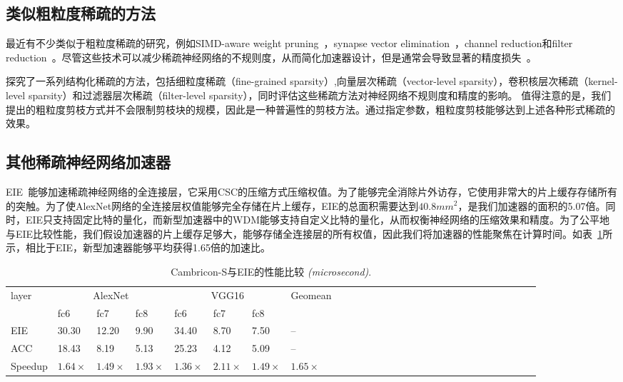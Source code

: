 \subsection{类似粗粒度稀疏的方法}
最近有不少类似于粗粒度稀疏的研究，例如SIMD-aware weight pruning~\cite{yu2017scalpel}，synapse vector elimination~\cite{hill2017deftnn}，channel reduction和filter reduction~\cite{wen2016learning,lebedev2016fast}。尽管这些技术可以减少稀疏神经网络的不规则度，从而简化加速器设计，但是通常会导致显著的精度损失~\cite{li2016pruning}。

\citet{mao2017exploring}探究了一系列结构化稀疏的方法，包括细粒度稀疏（fine-grained sparsity）,向量层次稀疏（vector-level sparsity），卷积核层次稀疏（kernel-level sparsity）和过滤器层次稀疏（filter-level sparsity），同时评估这些稀疏方法对神经网络不规则度和精度的影响。 值得注意的是，我们提出的粗粒度剪枝方式并不会限制剪枝块的规模，因此是一种普遍性的剪枝方法。通过指定参数，粗粒度剪枝能够达到上述各种形式稀疏的效果。

\subsection{其他稀疏神经网络加速器}
EIE~\cite{han2016eie}能够加速稀疏神经网络的全连接层，它采用CSC的压缩方式压缩权值。为了能够完全消除片外访存，它使用非常大的片上缓存存储所有的突触。为了使AlexNet网络的全连接层权值能够完全存储在片上缓存，EIE的总面积需要达到$40.8mm^2$，是我们加速器的面积的5.07倍。同时，EIE只支持固定比特的量化，而新型加速器中的WDM能够支持自定义比特的量化，从而权衡神经网络的压缩效果和精度。为了公平地与EIE比较性能，我们假设加速器的片上缓存足够大，能够存储全连接层的所有权值，因此我们将加速器的性能聚焦在计算时间。如表~\ref{tab:EIE}所示，相比于EIE，新型加速器能够平均获得1.65倍的加速比。

\begin{table}[h]
\centering
\caption{\footnotesize Cambricon-S与EIE的性能比较 \emph{(microsecond)}.}
\label{tab:EIE}
\begin{tabular}{@{}lll@{~~}lll@{~~}lll@{~~}lll@{~~}lll@{~~}lll@{~~}lll@{~~}lllllll}
\toprule
layer & \multicolumn{3}{c}{AlexNet} & \multicolumn{3}{c}{VGG16} & Geomean\\
& fc6 & fc7 & fc8 & fc6 & fc7 & fc8     \\
\midrule
EIE & 30.30 & 12.20 & 9.90  & 34.40 & 8.70  & 7.50  & --\\
ACC & 18.43 & 8.19  & 5.13  & 25.23 & 4.12  & 5.09  & --\\
Speedup & $1.64\times$ & $1.49\times$ & $1.93\times$ & $1.36\times$ & $2.11\times$ & $1.49\times$ & $1.65\times$ \\
\bottomrule
\end{tabular}
\end{table}

